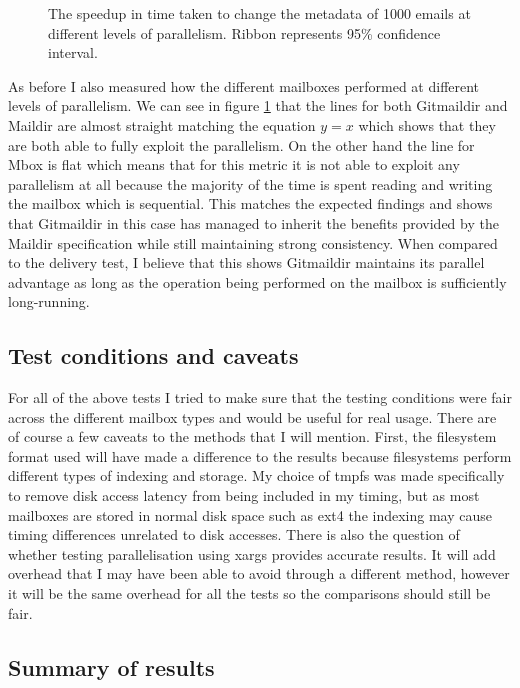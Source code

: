 \begin{figure}[h]
    \centering
    
    \caption{The speedup in time taken to change the metadata of 1000 emails at different levels of parallelism. Ribbon represents 95\% confidence interval.}
    \label{fig:tmpp_speedup_combined}
\end{figure}

As before I also measured how the different mailboxes performed at different levels of parallelism. We can see in figure \ref{fig:tmpp_speedup_combined} that the lines for both Gitmaildir and Maildir are almost straight matching the equation $y=x$ which shows that they are both able to fully exploit the parallelism. On the other hand the line for Mbox is flat which means that for this metric it is not able to exploit any parallelism at all because the majority of the time is spent reading and writing the mailbox which is sequential. This matches the expected findings and shows that Gitmaildir in this case has managed to inherit the benefits provided by the Maildir specification while still maintaining strong consistency. When compared to the delivery test, I believe that this shows Gitmaildir maintains its parallel advantage as long as the operation being performed on the mailbox is sufficiently long-running.

\subsection{Test conditions and caveats}

For all of the above tests I tried to make sure that the testing conditions were fair across the different mailbox types and would be useful for real usage. There are of course a few caveats to the methods that I will mention. First, the filesystem format used will have made a difference to the results because filesystems perform different types of indexing and storage. My choice of tmpfs was made specifically to remove disk access latency from being included in my timing, but as most mailboxes are stored in normal disk space such as ext4 the indexing may cause timing differences unrelated to disk accesses. There is also the question of whether testing parallelisation using xargs provides accurate results. It will add overhead that I may have been able to avoid through a different method, however it will be the same overhead for all the tests so the comparisons should still be fair.

\subsection{Summary of results}

